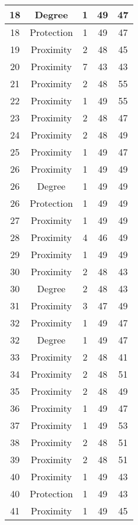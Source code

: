 \documentclass[results.tex]{subfiles}
\begin{document}
\begin{center}
\begin{tabular}{| c || c | c | c | c |}
    \hline
    18 & Degree & 1 & 49 & 47 \\ 
    \hline
    18 & Protection & 1 & 49 & 47 \\ 
    \hline
    19 & Proximity & 2 & 48 & 45 \\ 
    \hline
    20 & Proximity & 7 & 43 & 43 \\ 
    \hline
    21 & Proximity & 2 & 48 & 55 \\ 
    \hline
    22 & Proximity & 1 & 49 & 55 \\ 
    \hline
    23 & Proximity & 2 & 48 & 47 \\ 
    \hline
    24 & Proximity & 2 & 48 & 49 \\ 
    \hline
    25 & Proximity & 1 & 49 & 47 \\ 
    \hline
    26 & Proximity & 1 & 49 & 49 \\ 
    \hline
    26 & Degree & 1 & 49 & 49 \\ 
    \hline
    26 & Protection & 1 & 49 & 49 \\ 
    \hline
    27 & Proximity & 1 & 49 & 49 \\ 
    \hline
    28 & Proximity & 4 & 46 & 49 \\ 
    \hline
    29 & Proximity & 1 & 49 & 49 \\ 
    \hline
    30 & Proximity & 2 & 48 & 43 \\ 
    \hline
    30 & Degree & 2 & 48 & 43 \\ 
    \hline
    31 & Proximity & 3 & 47 & 49 \\ 
    \hline
    32 & Proximity & 1 & 49 & 47 \\ 
    \hline
    32 & Degree & 1 & 49 & 47 \\ 
    \hline
    33 & Proximity & 2 & 48 & 41 \\ 
    \hline
    34 & Proximity & 2 & 48 & 51 \\ 
    \hline
    35 & Proximity & 2 & 48 & 49 \\ 
    \hline
    36 & Proximity & 1 & 49 & 47 \\ 
    \hline
    37 & Proximity & 1 & 49 & 53 \\ 
    \hline
    38 & Proximity & 2 & 48 & 51 \\ 
    \hline
    39 & Proximity & 2 & 48 & 51 \\ 
    \hline
    40 & Proximity & 1 & 49 & 43 \\ 
    \hline
    40 & Protection & 1 & 49 & 43 \\ 
    \hline
    41 & Proximity & 1 & 49 & 45 \\ 

\end{tabular}
\end{center}
\end{document}
